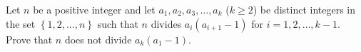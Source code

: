 Let $n$ be a positive integer and let $a_1,a_2,a_3,\ldots,a_k$ ($k\geq2$) be distinct integers in the set $\left\{1,2,\ldots,n\right\}$ such that $n$ divides $a_i\left(a_{i+1}-1\right)$ for $i=1,2,\ldots,k-1$. Prove that $n$ does not divide $a_k\left(a_1-1\right)$.